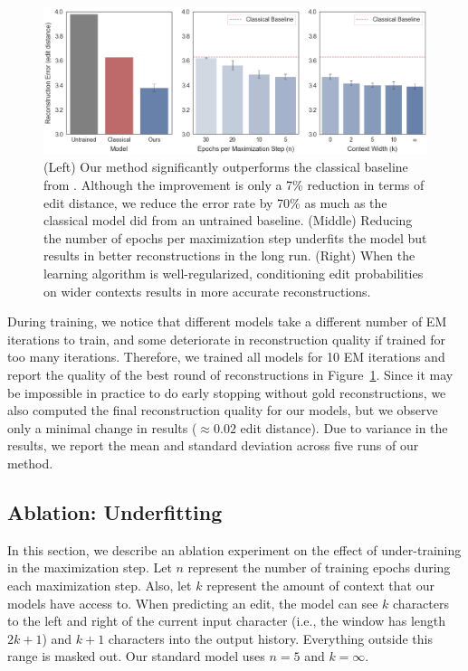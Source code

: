\documentclass[11pt]{article}
\begin{document}
\begin{figure}[t!]
    \centering
   \includegraphics[width=\textwidth]{images/results.pdf}
    \caption{(Left) Our method significantly outperforms the classical baseline from  \citet{bouchard-cote-etal-2009-improved}. Although the improvement is only a 7\% reduction in terms of edit distance, we reduce the error rate by 70\% as much as the classical model did from an untrained baseline. (Middle) Reducing the number of epochs per maximization step underfits the model but results in better reconstructions in the long run. (Right) When the learning algorithm is well-regularized, conditioning edit probabilities on wider contexts results in more accurate reconstructions. 
    }
    \label{fig:results}
\end{figure}



During training, we notice that different models take a different number of EM iterations to train, and some deteriorate in reconstruction quality if trained for too many iterations. Therefore, we trained all models for 10 EM iterations and report the quality of the best round of reconstructions in Figure~\ref{fig:results}. Since it may be impossible in practice to do early stopping without gold reconstructions, we also computed the final reconstruction quality for our models, but we observe only a minimal change in results ($\approx 0.02$ edit distance). Due to variance in the results, we report the mean and standard deviation across five runs of our method. 

\subsection{Ablation: Underfitting}
In this section, we describe an ablation experiment on the effect of under-training in the maximization step. Let $n$ represent the number of training epochs during each maximization step. Also, let $k$ represent the amount of context that our models have access to. When predicting an edit, the model can see $k$ characters to the left and right of the current input character (i.e., the window has length $2k+1$) and $k+1$ characters into the output history. Everything outside this range is masked out. Our standard model uses $n=5$ and $k=\infty$.
\end{document}
